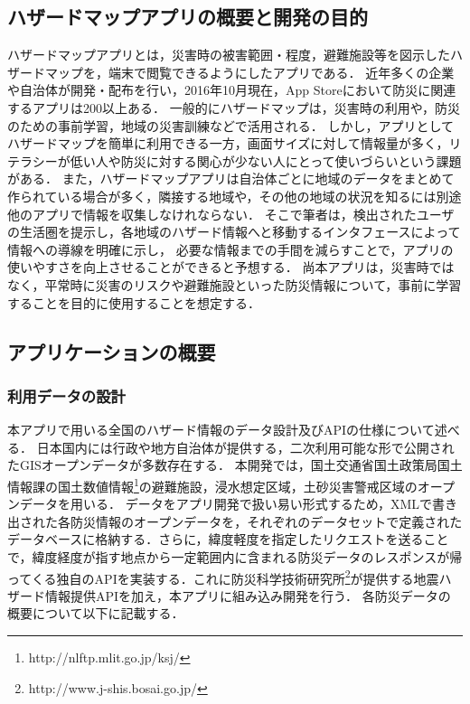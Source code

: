 \documentclass[a4paper]{jsarticle}
\begin{document}
\subsection{ハザードマップアプリの概要と開発の目的}
ハザードマップアプリとは，災害時の被害範囲・程度，避難施設等を図示したハザードマップを，端末で閲覧できるようにしたアプリである．
近年多くの企業や自治体が開発・配布を行い，2016年10月現在，App Storeにおいて防災に関連するアプリは200以上ある．
一般的にハザードマップは，災害時の利用や，防災のための事前学習，地域の災害訓練などで活用される．
しかし，アプリとしてハザードマップを簡単に利用できる一方，画面サイズに対して情報量が多く，リテラシーが低い人や防災に対する関心が少ない人にとって使いづらいという課題がある．
また，ハザードマップアプリは自治体ごとに地域のデータをまとめて作られている場合が多く，隣接する地域や，その他の地域の状況を知るには別途他のアプリで情報を収集しなけれならない．
そこで筆者は，検出されたユーザの生活圏を提示し，各地域のハザード情報へと移動するインタフェースによって情報への導線を明確に示し，
必要な情報までの手間を減らすことで，アプリの使いやすさを向上させることができると予想する．
尚本アプリは，災害時ではなく，平常時に災害のリスクや避難施設といった防災情報について，事前に学習することを目的に使用することを想定する．


\subsection{アプリケーションの概要}

\subsubsection{利用データの設計}
本アプリで用いる全国のハザード情報のデータ設計及びAPIの仕様について述べる．
日本国内には行政や地方自治体が提供する，二次利用可能な形で公開されたGISオープンデータが多数存在する．
本開発では，国土交通省国土政策局国土情報課の国土数値情報\footnote{http://nlftp.mlit.go.jp/ksj/}の避難施設，浸水想定区域，土砂災害警戒区域のオープンデータを用いる．
データをアプリ開発で扱い易い形式するため，XMLで書き出された各防災情報のオープンデータを，それぞれのデータセットで定義されたデータベースに格納する．さらに，緯度軽度を指定したリクエストを送ることで，緯度経度が指す地点から一定範囲内に含まれる防災データのレスポンスが帰ってくる独自のAPIを実装する．これに防災科学技術研究所\footnote{http://www.j-shis.bosai.go.jp/}が提供する地震ハザード情報提供APIを加え，本アプリに組み込み開発を行う．
各防災データの概要について以下に記載する．
\end{document}
